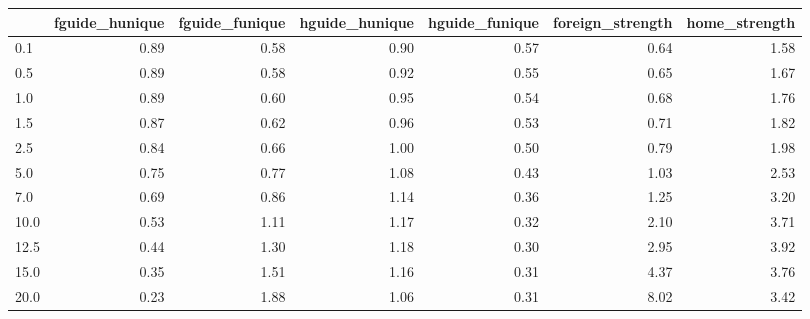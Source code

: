 \begin{tabular}{lrrrrrr}
\toprule
 & fguide_hunique & fguide_funique & hguide_hunique & hguide_funique & foreign_strength & home_strength \\
\midrule
0.1 & 0.89 & 0.58 & 0.90 & 0.57 & 0.64 & 1.58 \\
0.5 & 0.89 & 0.58 & 0.92 & 0.55 & 0.65 & 1.67 \\
1.0 & 0.89 & 0.60 & 0.95 & 0.54 & 0.68 & 1.76 \\
1.5 & 0.87 & 0.62 & 0.96 & 0.53 & 0.71 & 1.82 \\
2.5 & 0.84 & 0.66 & 1.00 & 0.50 & 0.79 & 1.98 \\
5.0 & 0.75 & 0.77 & 1.08 & 0.43 & 1.03 & 2.53 \\
7.0 & 0.69 & 0.86 & 1.14 & 0.36 & 1.25 & 3.20 \\
10.0 & 0.53 & 1.11 & 1.17 & 0.32 & 2.10 & 3.71 \\
12.5 & 0.44 & 1.30 & 1.18 & 0.30 & 2.95 & 3.92 \\
15.0 & 0.35 & 1.51 & 1.16 & 0.31 & 4.37 & 3.76 \\
20.0 & 0.23 & 1.88 & 1.06 & 0.31 & 8.02 & 3.42 \\
\bottomrule
\end{tabular}
